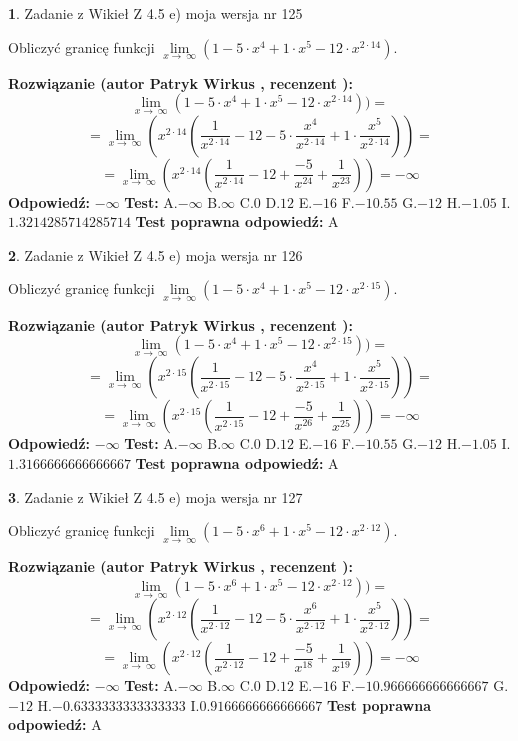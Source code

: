 \documentclass[12pt, a4paper]{article}
\theoremstyle{definition} %
\newtheorem{zad}{}
\newcommand{\zadStart}[1]{\begin{zad}#1\newline}
\newcommand{\zadStop}{\end{zad}}
\newcommand{\rozwStart}[2]{\noindent \textbf{Rozwiązanie (autor #1 , recenzent #2): }\newline}
\newcommand{\rozwStop}{\newline}
\newcommand{\odpStart}{\noindent \textbf{Odpowiedź:}\newline}
\newcommand{\odpStop}{\newline}
\newcommand{\testStart}{\noindent \textbf{Test:}\newline}
\newcommand{\testStop}{\newline}
\newcommand{\kluczStart}{\noindent \textbf{Test poprawna odpowiedź:}\newline}
\newcommand{\kluczStop}{\newline}
\begin{document}
\zadStart{Zadanie z Wikieł Z 4.5 e) moja wersja nr 125}


Obliczyć granicę funkcji  $\lim\limits_{x\to\ \infty}(1 - 5 \cdot x^{4}+1 \cdot x^{5}- 12 \cdot x^{2\cdot14})$.
\zadStop
\rozwStart{Patryk Wirkus}{}
$$\lim\limits_{x\to\ \infty}(1 - 5 \cdot x^{4}+1 \cdot x^{5}- 12 \cdot x^{2\cdot14}))=$$
$$=\lim\limits_{x\to\ \infty}(x^{2\cdot14}(\frac{1}{x^{2\cdot14}}-12 -5 \cdot \frac{x^{4}}{x^{2\cdot14}}+1 \cdot \frac{x^{5}}{x^{2\cdot14}}))=$$
$$=\lim\limits_{x\to\ \infty}(x^{2\cdot14}(\frac{1}{x^{2\cdot14}}-12 + \frac{-5}{x^{24}}+ \frac{1}{x^{23}}))=-\infty$$
\rozwStop
\odpStart
$-\infty$
\odpStop
\testStart
A.$-\infty$ B.$\infty$ C.$0$ D.$12$ E.$-16$
F.$-10.55$ G.$-12$
H.$-1.05$
I.$1.3214285714285714$
\testStop
\kluczStart
A
\kluczStop



\zadStart{Zadanie z Wikieł Z 4.5 e) moja wersja nr 126}


Obliczyć granicę funkcji  $\lim\limits_{x\to\ \infty}(1 - 5 \cdot x^{4}+1 \cdot x^{5}- 12 \cdot x^{2\cdot15})$.
\zadStop
\rozwStart{Patryk Wirkus}{}
$$\lim\limits_{x\to\ \infty}(1 - 5 \cdot x^{4}+1 \cdot x^{5}- 12 \cdot x^{2\cdot15}))=$$
$$=\lim\limits_{x\to\ \infty}(x^{2\cdot15}(\frac{1}{x^{2\cdot15}}-12 -5 \cdot \frac{x^{4}}{x^{2\cdot15}}+1 \cdot \frac{x^{5}}{x^{2\cdot15}}))=$$
$$=\lim\limits_{x\to\ \infty}(x^{2\cdot15}(\frac{1}{x^{2\cdot15}}-12 + \frac{-5}{x^{26}}+ \frac{1}{x^{25}}))=-\infty$$
\rozwStop
\odpStart
$-\infty$
\odpStop
\testStart
A.$-\infty$ B.$\infty$ C.$0$ D.$12$ E.$-16$
F.$-10.55$ G.$-12$
H.$-1.05$
I.$1.3166666666666667$
\testStop
\kluczStart
A
\kluczStop



\zadStart{Zadanie z Wikieł Z 4.5 e) moja wersja nr 127}


Obliczyć granicę funkcji  $\lim\limits_{x\to\ \infty}(1 - 5 \cdot x^{6}+1 \cdot x^{5}- 12 \cdot x^{2\cdot12})$.
\zadStop
\rozwStart{Patryk Wirkus}{}
$$\lim\limits_{x\to\ \infty}(1 - 5 \cdot x^{6}+1 \cdot x^{5}- 12 \cdot x^{2\cdot12}))=$$
$$=\lim\limits_{x\to\ \infty}(x^{2\cdot12}(\frac{1}{x^{2\cdot12}}-12 -5 \cdot \frac{x^{6}}{x^{2\cdot12}}+1 \cdot \frac{x^{5}}{x^{2\cdot12}}))=$$
$$=\lim\limits_{x\to\ \infty}(x^{2\cdot12}(\frac{1}{x^{2\cdot12}}-12 + \frac{-5}{x^{18}}+ \frac{1}{x^{19}}))=-\infty$$
\rozwStop
\odpStart
$-\infty$
\odpStop
\testStart
A.$-\infty$ B.$\infty$ C.$0$ D.$12$ E.$-16$
F.$-10.966666666666667$ G.$-12$
H.$-0.6333333333333333$
I.$0.9166666666666667$
\testStop
\kluczStart
A
\kluczStop
\end{document}
